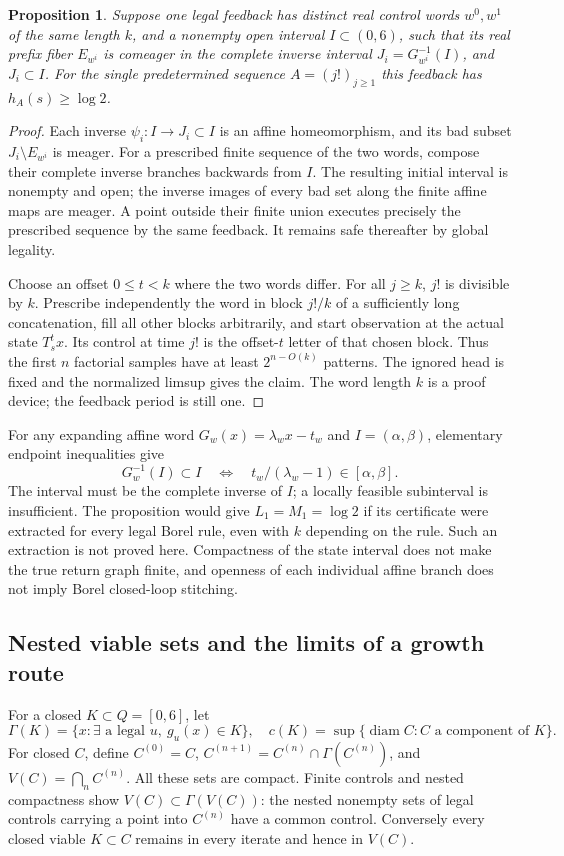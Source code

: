 \documentclass[11pt,reqno]{amsart}
\numberwithin{equation}{section}
\newtheorem{proposition}[theorem]{Proposition}
\theoremstyle{definition}
\begin{document}
\begin{proposition}\label{prop:return-certificate}
Suppose one legal feedback has distinct real control words $w^0,w^1$
of the same length $k$, and a nonempty open interval $I\subset(0,6)$,
such that its real prefix fiber $E_{w^i}$ is comeager in the complete
inverse interval $J_i=G_{w^i}^{-1}(I)$, and $J_i\subset I$.
For the single predetermined sequence $A=(j!)_{j\ge1}$ this
feedback has $h_A(s)\ge\log2$.
\end{proposition}
\begin{proof}
Each inverse $\psi_i:I\to J_i\subset I$ is an affine
homeomorphism, and its bad subset $J_i\setminus E_{w^i}$ is
meager. For a prescribed finite sequence of the two words, compose
their complete inverse branches backwards from $I$. The resulting
initial interval is nonempty and open; the inverse images of every
bad set along the finite affine maps are meager. A point outside
their finite union executes precisely the prescribed sequence by
the same feedback. It remains safe thereafter by global legality.

Choose an offset $0\le t<k$ where the two words differ. For
all $j\ge k$, $j!$ is divisible by $k$. Prescribe independently
the word in block $j!/k$ of a sufficiently long concatenation,
fill all other blocks arbitrarily, and start observation at the
actual state $T_s^t x$. Its control at time $j!$ is the offset-$t$
letter of that chosen block. Thus the first $n$ factorial samples
have at least $2^{n-O(k)}$ patterns. The ignored head is fixed
and the normalized limsup gives the claim. The word length $k$
is a proof device; the feedback period is still one.
\end{proof}

For any expanding affine word $G_w(x)=\lambda_w x-t_w$ and
$I=(\alpha,\beta)$, elementary endpoint inequalities give
\[
 G_w^{-1}(I)\subset I
 \quad\Longleftrightarrow\quad
 t_w/(\lambda_w-1)\in[\alpha,\beta].
\]
The interval must be the complete inverse of $I$; a locally feasible
subinterval is insufficient. The proposition would give
$L_1=M_1=\log2$ if its certificate were extracted for every
legal Borel rule, even with $k$ depending on the rule. Such an
extraction is not proved here. Compactness of the state interval
does not make the true return graph finite, and openness of each
individual affine branch does not imply Borel closed-loop stitching.

\subsection{Nested viable sets and the limits of a growth route}
For a closed $K\subset Q=[0,6]$, let
\[
 \Gamma(K)=\{x:\exists\text{ a legal }u,\ g_u(x)\in K\},
 \quad c(K)=\sup\{\operatorname{diam}C:C\text{ a component of }K\}.
\]
For closed $C$, define $C^{(0)}=C$,
$C^{(n+1)}=C^{(n)}\cap\Gamma(C^{(n)})$, and
$V(C)=\bigcap_n C^{(n)}$. All these sets are compact.
Finite controls and nested compactness show $V(C)\subset\Gamma(V(C))$:
the nested nonempty sets of legal controls carrying a point into
$C^{(n)}$ have a common control. Conversely every closed viable
$K\subset C$ remains in every iterate and hence in $V(C)$.
\end{document}
